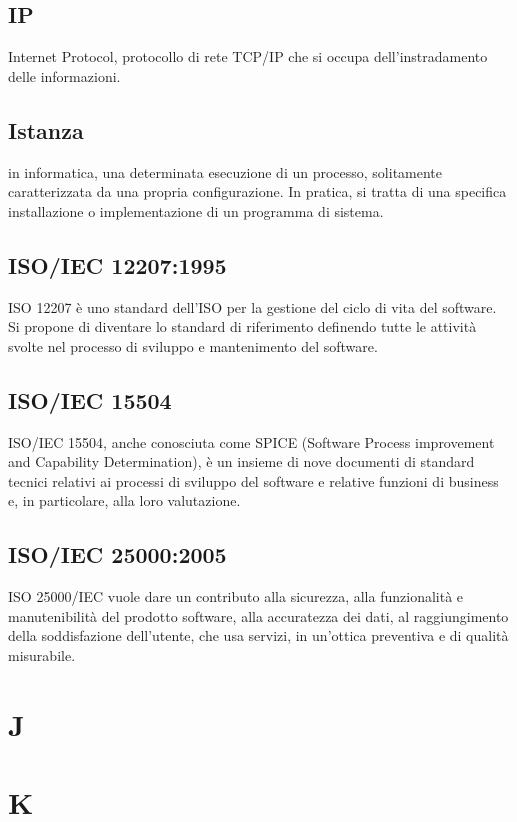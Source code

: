 \documentclass{classes/base}
\begin{document}
        \subsection*{IP}
        Internet Protocol, protocollo di rete TCP/IP che si occupa dell'instradamento delle informazioni.

        \subsection*{Istanza}
        in informatica, una determinata esecuzione di un processo, solitamente caratterizzata da una propria configurazione. In pratica, si tratta di una specifica installazione o implementazione di un programma di sistema.
        
        \subsection*{ISO/IEC 12207:1995}   
        ISO 12207 è uno standard dell'ISO per la gestione del ciclo di vita del software. 
        Si propone di diventare lo standard di riferimento definendo tutte le attività svolte nel processo di sviluppo e mantenimento del software. 

        \subsection*{ISO/IEC 15504}
        ISO/IEC 15504, anche conosciuta come SPICE (Software Process improvement and Capability Determination),
        è un insieme di nove documenti di standard tecnici relativi ai processi di sviluppo del software e relative funzioni di business e, in particolare, alla loro valutazione.
        
        \subsection*{ISO/IEC 25000:2005}
        ISO 25000/IEC vuole dare un contributo alla sicurezza, alla funzionalità e manutenibilità del prodotto software, alla accuratezza dei dati, al raggiungimento della soddisfazione dell'utente, che usa servizi, in un'ottica preventiva e di qualità misurabile.
        
        \newpage  
    \section{J}
    \newpage  
    \section{K}
    \newpage  
\end{document}
